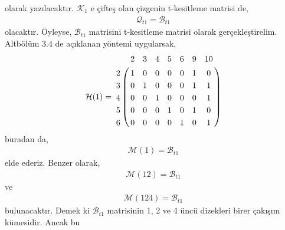 \documentclass[11pt]{amsbook}
\let\bbordermatrix\bordermatrix
\begin{document}
	olarak yazılacaktır. $\mathcal{K}_{1}$ e çifteş  olan çizgenin t-kesitleme matrisi de,
	\begin{align*}
		\mathcal{Q}_{t1} = \mathcal{B}_{t1}
	\end{align*}
	olacaktır. Öyleyse, $\mathcal{B}_{t1}$ matrisini t-kesitleme matrisi olarak gerçekleştirelim.
	Altbölüm 3.4 de açıklanan yöntemi uygularsak,
	\begin{align*}
	\mathcal{H}(1) = \bbordermatrix{
		~ & 2 & 3 & 4 & 5 & 6 & 9 & 10 \cr
		2 & 1 & 0 & 0 & 0 & 0 & 1 & 0 \cr
		3 & 0 & 1 & 0 & 0 & 0 & 1 & 1 \cr
		4 & 0 & 0 & 1 & 0 & 0 & 0 & 1 \cr
		5 & 0 & 0 & 0 & 1 & 0 & 1 & 0 \cr
		6 & 0 & 0 & 0 & 0 & 1 & 0 & 1 \cr
	}
	\end{align*}
	buradan da,
	\begin{align*}
		\mathcal{M}(1) = \mathcal{B}_{t1}
	\end{align*}
	elde ederiz. Benzer olarak,
	\begin{align*}
		\mathcal{M}(12) = \mathcal{B}_{t1}
	\end{align*}
	ve
	\begin{align*}
		\mathcal{M}(124) = \mathcal{B}_{t1}
	\end{align*}
	bulunacaktır. Demek ki $\mathcal{B}_{t1}$ matrisinin 1, 2 ve 4 üncü dizekleri birer çakışım kümesidir. Ancak bu
\end{document}

